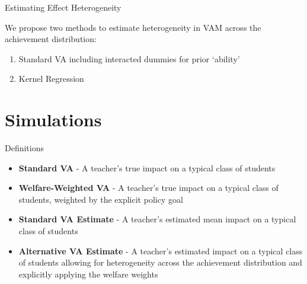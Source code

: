 \documentclass[11pt]{beamer}
\begin{document}

\begin{frame}{Estimating Effect Heterogeneity}

    We propose two methods to estimate heterogeneity in VAM across the achievement distribution:
    
    \begin{enumerate}
        \item Standard VA including interacted dummies for prior `ability'
        \item Kernel Regression
    \end{enumerate}
    
\end{frame}





\section{Simulations}


\begin{frame}{Definitions}

    \begin{itemize}
        \item<1-> \textbf{Standard VA} - A teacher's true impact on a typical class of students
        \item<1-> \textbf{Welfare-Weighted VA} - A teacher's true impact on a typical class of students, weighted by the explicit policy goal
        \item<3> \textbf{Standard VA Estimate} - A teacher's estimated mean impact on a typical class of students
        \item<3> \textbf{Alternative VA Estimate} - A teacher's estimated impact on a typical class of students allowing for heterogeneity across the achievement distribution and explicitly applying the welfare weights
    \end{itemize}
    

\end{frame}
\end{document}
